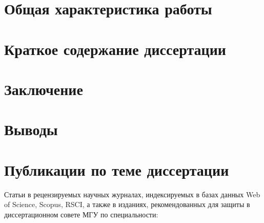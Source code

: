 \documentclass[a5paper,10pt]{article}
\begin{document}
\addtocounter{page}{1}
\section*{Общая характеристика работы}

\section*{Краткое содержание диссертации}

\section*{Заключение}

\section*{Выводы}
\begin{enumerate}
  
\end{enumerate}
\section*{Публикации по теме диссертации}
Статьи в рецензируемых научных журналах, индексируемых в базах данных Web of Science, Scopus, RSCI, а также в изданиях, рекомендованных для защиты в диссертационном совете МГУ по специальности:
\begin{enumerate}
  
\end{enumerate}

% 


\end{document}
